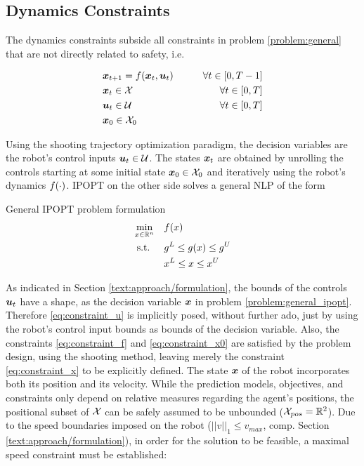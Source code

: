 \subsection{Dynamics Constraints}
\label{text:approach/constraint/dynamics}
The dynamics constraints subside all constraints in problem \ref{problem:general} that are not directly related to safety, i.e. 

\begin{align}
\label{eq:constraint_f}
&\boldsymbol{x}_{t+1} = f(\boldsymbol{x}_t, \boldsymbol{u}_t) \qquad& \forall t \in [0, T - 1] \\
\label{eq:constraint_x}
&\boldsymbol{x}_t \in \mathcal{X} & \forall t \in [0, T]\\
\label{eq:constraint_u}
&\boldsymbol{u}_t \in \mathcal{U} & \forall t \in [0, T]\\
\label{eq:constraint_x0}
&\boldsymbol{x}_0 \in \mathcal{X}_0
\end{align}

Using the shooting trajectory optimization paradigm, the decision variables are the robot's control inputs $\boldsymbol{u}_t \in \mathcal{U}$. The states $\boldsymbol{x}_t$ are obtained by unrolling the controls starting at some initial state $\boldsymbol{x}_0 \in \mathcal{X}_0$ and iteratively using the robot's dynamics $f(\cdot)$. \ac{IPOPT} on the other side solves a general \ac{NLP} of the form \cite{Wachter2006} \\

\begin{problem}{General IPOPT problem formulation}
\begin{align}
\min_{x \in \mathbb{R}^n} \quad & f(x) \\
\textrm{s.t. } \quad & g^L \leq g(x) \leq g^U \\
& x^L \leq x \leq x^U 
\end{align}
\label{problem:general_ipopt}
\end{problem}

As indicated in Section \ref{text:approach/formulation}, the bounds of the controls $\boldsymbol{u}_t$ have a shape, as the decision variable $\boldsymbol{x}$ in problem \ref{problem:general_ipopt}. Therefore \ref{eq:constraint_u} is implicitly posed, without further ado, just by using the robot's control input bounds as bounds of the decision variable. Also, the constraints \ref{eq:constraint_f} and  \ref{eq:constraint_x0} are satisfied by the problem design, using the shooting method, leaving merely the constraint \ref{eq:constraint_x} to be explicitly defined. The state $\boldsymbol{x}$ of the robot incorporates both its position and its velocity. While the prediction models, objectives, and constraints only depend on relative measures regarding the agent's positions, the positional subset of $\mathcal{X}$ can be safely assumed to be unbounded ($\mathcal{X}_{pos} = \mathbb{R}^2$). Due to the speed boundaries imposed on the robot ($||v||_1 \leq v_{max}$, comp. Section \ref{text:approach/formulation}), in order for the solution to be feasible, a maximal speed constraint must be established:

